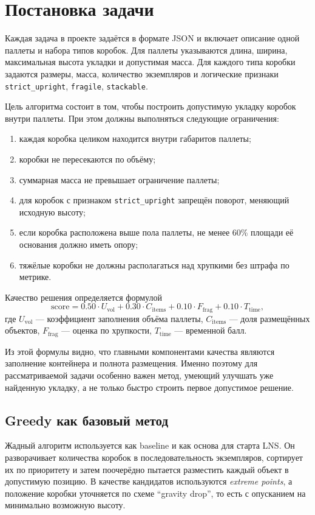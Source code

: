 \documentclass[12pt,a4paper]{article}
\begin{document}
\section{Постановка задачи}

Каждая задача в проекте задаётся в формате JSON и включает описание одной паллеты и набора типов коробок. Для паллеты указываются длина, ширина, максимальная высота укладки и допустимая масса. Для каждого типа коробки задаются размеры, масса, количество экземпляров и логические признаки \texttt{strict\_upright}, \texttt{fragile}, \texttt{stackable}.

Цель алгоритма состоит в том, чтобы построить допустимую укладку коробок внутри паллеты. При этом должны выполняться следующие ограничения:
\begin{enumerate}
  \item каждая коробка целиком находится внутри габаритов паллеты;
  \item коробки не пересекаются по объёму;
  \item суммарная масса не превышает ограничение паллеты;
  \item для коробок с признаком \texttt{strict\_upright} запрещён поворот, меняющий исходную высоту;
  \item если коробка расположена выше пола паллеты, не менее 60\% площади её основания должно иметь опору;
  \item тяжёлые коробки не должны располагаться над хрупкими без штрафа по метрике.
\end{enumerate}

Качество решения определяется формулой
\[
\text{score} =
0.50 \cdot U_{\text{vol}} +
0.30 \cdot C_{\text{items}} +
0.10 \cdot F_{\text{frag}} +
0.10 \cdot T_{\text{time}},
\]
где $U_{\text{vol}}$ --- коэффициент заполнения объёма паллеты, $C_{\text{items}}$ --- доля размещённых объектов, $F_{\text{frag}}$ --- оценка по хрупкости, $T_{\text{time}}$ --- временной балл.

Из этой формулы видно, что главными компонентами качества являются заполнение контейнера и полнота размещения. Именно поэтому для рассматриваемой задачи особенно важен метод, умеющий улучшать уже найденную укладку, а не только быстро строить первое допустимое решение.

\subsection{Greedy как базовый метод}

Жадный алгоритм используется как baseline и как основа для старта LNS. Он разворачивает количества коробок в последовательность экземпляров, сортирует их по приоритету и затем поочерёдно пытается разместить каждый объект в допустимую позицию. В качестве кандидатов используются \textit{extreme points}, а положение коробки уточняется по схеме ``gravity drop'', то есть с опусканием на минимально возможную высоту.
\end{document}
